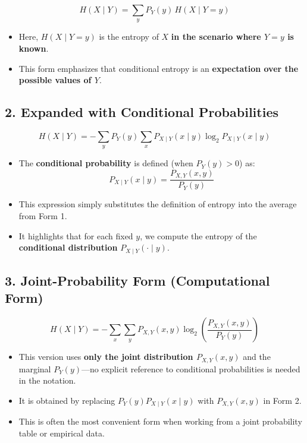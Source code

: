 \documentclass[11pt]{article}
\begin{document}
\[
\boxed{
H(X \mid Y) = \sum_{y} P_Y(y) \, H(X \mid Y = y)
}
\]

\begin{itemize}
    \item Here, \(H(X \mid Y = y)\) is the entropy of \(X\) \textbf{in the scenario where \(Y = y\) is known}.
    \item This form emphasizes that conditional entropy is an \textbf{expectation over the possible values of \(Y\)}.
\end{itemize}

\subsection*{2. Expanded with Conditional Probabilities}

\[
\boxed{
H(X \mid Y) = -\sum_{y} P_Y(y) \sum_{x} P_{X \mid Y}(x \mid y) \log_2 P_{X \mid Y}(x \mid y)
}
\]

\begin{itemize}
    \item The \textbf{conditional probability} is defined (when \(P_Y(y) > 0\)) as:
    \[
    P_{X \mid Y}(x \mid y) = \frac{P_{X,Y}(x, y)}{P_Y(y)}
    \]
    \item This expression simply substitutes the definition of entropy into the average from Form 1.
    \item It highlights that for each fixed \(y\), we compute the entropy of the \textbf{conditional distribution} \(P_{X \mid Y}(\cdot \mid y)\).
\end{itemize}


\subsection*{3. Joint-Probability Form (Computational Form)}

\[
\boxed{
H(X \mid Y) = -\sum_{x} \sum_{y} P_{X,Y}(x, y) \log_2 \left( \frac{P_{X,Y}(x, y)}{P_Y(y)} \right)
}
\]

\begin{itemize}
    \item This version uses \textbf{only the joint distribution \(P_{X,Y}(x,y)\)} and the marginal \(P_Y(y)\)—no explicit reference to conditional probabilities is needed in the notation.
    \item It is obtained by replacing \(P_Y(y) P_{X \mid Y}(x \mid y)\) with \(P_{X,Y}(x, y)\) in Form 2.
    \item This is often the most convenient form when working from a joint probability table or empirical data.
\end{itemize}
\end{document}
